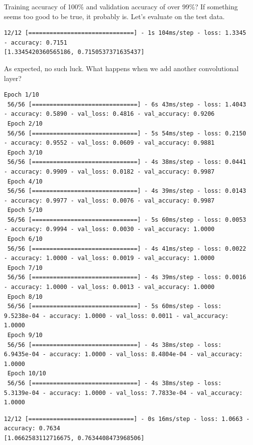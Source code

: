 \documentclass{article}
\begin{document}
Training accuracy of 100\% and validation accuracy of over 99\%? If something seems too good to be true, it probably is. Let's evaluate on the test data.



\begin{lstlisting}[style=output]
12/12 [==============================] - 1s 104ms/step - loss: 1.3345 - accuracy: 0.7151
[1.3345420360565186, 0.7150537371635437] 
\end{lstlisting}

As expected, no such luck. What happens when we add another convolutional layer?



\begin{lstlisting}[style=output]
 Epoch 1/10
 56/56 [==============================] - 6s 43ms/step - loss: 1.4043 - accuracy: 0.5890 - val_loss: 0.4816 - val_accuracy: 0.9206
 Epoch 2/10
 56/56 [==============================] - 5s 54ms/step - loss: 0.2150 - accuracy: 0.9552 - val_loss: 0.0609 - val_accuracy: 0.9881
 Epoch 3/10
 56/56 [==============================] - 4s 38ms/step - loss: 0.0441 - accuracy: 0.9909 - val_loss: 0.0182 - val_accuracy: 0.9987
 Epoch 4/10
 56/56 [==============================] - 4s 39ms/step - loss: 0.0143 - accuracy: 0.9977 - val_loss: 0.0076 - val_accuracy: 0.9987
 Epoch 5/10
 56/56 [==============================] - 5s 60ms/step - loss: 0.0053 - accuracy: 0.9994 - val_loss: 0.0030 - val_accuracy: 1.0000
 Epoch 6/10
 56/56 [==============================] - 4s 41ms/step - loss: 0.0022 - accuracy: 1.0000 - val_loss: 0.0019 - val_accuracy: 1.0000
 Epoch 7/10
 56/56 [==============================] - 4s 39ms/step - loss: 0.0016 - accuracy: 1.0000 - val_loss: 0.0013 - val_accuracy: 1.0000
 Epoch 8/10
 56/56 [==============================] - 5s 60ms/step - loss: 9.5238e-04 - accuracy: 1.0000 - val_loss: 0.0011 - val_accuracy: 1.0000
 Epoch 9/10
 56/56 [==============================] - 4s 38ms/step - loss: 6.9435e-04 - accuracy: 1.0000 - val_loss: 8.4804e-04 - val_accuracy: 1.0000
 Epoch 10/10
 56/56 [==============================] - 4s 38ms/step - loss: 5.3139e-04 - accuracy: 1.0000 - val_loss: 7.7833e-04 - val_accuracy: 1.0000
\end{lstlisting}



\begin{lstlisting}[style=output]
12/12 [==============================] - 0s 16ms/step - loss: 1.0663 - accuracy: 0.7634
[1.0662583112716675, 0.7634408473968506]
\end{lstlisting}
\end{document}
